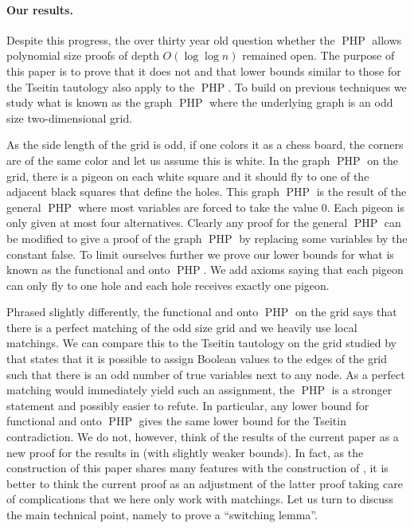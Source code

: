 \documentclass{article}\usepackage[a4paper,margin=20mm]{geometry}
\DeclareMathOperator{\PHP}{PHP}
\begin{document}
\paragraph{Our results.}
Despite this progress, the over thirty year old question whether the
$\PHP$ allows polynomial size proofs of depth $O( \log \log n)$
remained open.  The purpose of this paper is to prove
that it does not and that lower bounds similar to
those for the Tseitin tautology also apply to the
$\PHP$.   To build on previous techniques we study what is known as the
graph $\PHP$ where the underlying graph is an odd size
two-dimensional grid.  

As the side length of the grid is odd, if one colors it
as a chess board,  the corners are of the same color and
let us assume this is white.
In the graph $\PHP$ on
the grid, there is a pigeon on each white square and
it should fly to one of the adjacent black squares
that define the holes.   This graph $\PHP$ is the result
of the general $\PHP$ where most variables are forced to 
take the value $0$.
Each pigeon is only given at most four alternatives.
Clearly any proof for the general $\PHP$ can be modified
to give a proof of the graph $\PHP$ by replacing some variables
by the constant false.  To limit ourselves
further we prove our lower bounds for what is known
as the functional and onto $\PHP$.  We add axioms saying
that each pigeon can only fly to one hole and each hole
receives exactly one pigeon.

Phrased slightly differently, the functional and onto
$\PHP$ on the grid says that
there is a perfect matching of the odd size grid and we heavily use
local matchings.   We can compare this to
the Tseitin tautology on the grid studied
by \cite{jhtseitin, PRT21, jhkr} that states that it is possible to
assign Boolean values
to the edges of the grid such that there is an odd number
of true variables next to any node.  As a perfect matching
would immediately yield such an assignment, the $\PHP$ is a stronger
statement and possibly easier to refute.
In particular, any lower bound for functional and onto $\PHP$ gives
the same lower bound for the Tseitin contradiction.
We do not, however, think of the results of the current paper
as a new proof for the results in  \cite{jhkr} (with slightly weaker bounds).
In fact, as the construction
of this paper shares many features with the construction
of \cite{jhkr}, it is better to think the current proof
as an adjustment of the latter proof taking care of complications
that we here only work with matchings.
Let us turn to discuss the main technical point,
namely to prove a ``switching lemma''.
\end{document}
